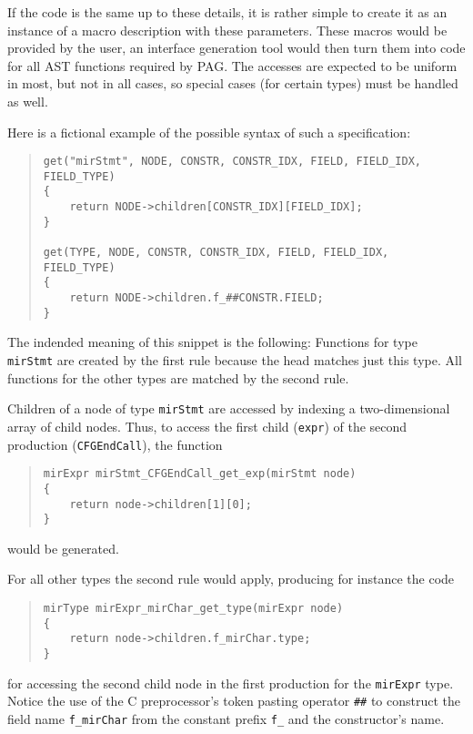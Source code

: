 If the code is the same up to these details, it is rather simple to
create it as an instance of a macro description with these
parameters. These macros would be provided by the user, an interface
generation tool would then turn them into code for all AST functions
required by PAG. The accesses are expected to be uniform in most,
but not in all cases, so special cases (for certain types) must be
handled as well.

Here is a fictional example of the possible syntax of such a
specification:

\begin{quote}
\begin{verbatim}
get("mirStmt", NODE, CONSTR, CONSTR_IDX, FIELD, FIELD_IDX, FIELD_TYPE)
{
    return NODE->children[CONSTR_IDX][FIELD_IDX];
}

get(TYPE, NODE, CONSTR, CONSTR_IDX, FIELD, FIELD_IDX, FIELD_TYPE)
{
    return NODE->children.f_##CONSTR.FIELD;
}
\end{verbatim}
\end{quote}

The indended meaning of this snippet is the following: Functions for
type \verb|mirStmt| are created by the first rule because the head
matches just this type. All functions for the other types are
matched by the second rule.

Children of a node of type \verb|mirStmt| are accessed by indexing a
two-dimensional array of child nodes. Thus, to access the first
child (\verb|expr|) of the second production (\verb|CFGEndCall|),
the function
\begin{quote}
\begin{verbatim} 
mirExpr mirStmt_CFGEndCall_get_exp(mirStmt node)
{
    return node->children[1][0];
}
\end{verbatim}
\end{quote}
would be generated.

For all other types the second rule would apply, producing for
instance the code
\begin{quote}
\begin{verbatim}
mirType mirExpr_mirChar_get_type(mirExpr node)
{
    return node->children.f_mirChar.type;
}
\end{verbatim}
\end{quote}
for accessing the second child node in the first production for the
\verb|mirExpr| type.
Notice the use of the C preprocessor's token pasting operator
\verb|##| to construct the field name \verb|f_mirChar| from the
constant prefix \verb|f_| and the constructor's name.

